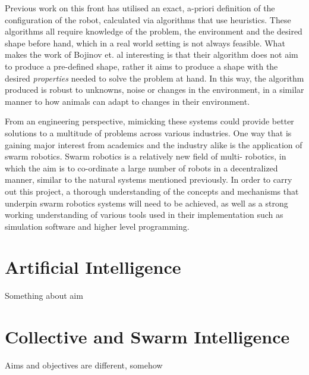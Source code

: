 Previous work on this front has utilised an exact, a-priori definition of the configuration of the robot, calculated via algorithms that use heuristics. \cite{metricsrob} These algorithms all require knowledge of the problem, the environment and the desired shape before hand, which in a real world setting is not always feasible.  What makes the work of Bojinov et. al interesting is that their algorithm does not aim to produce a pre-defined shape, rather it aims to produce a shape with the desired \textsl{properties} needed to solve the problem at hand. In this way, the algorithm produced is robust to unknowns, noise or changes in the environment, in a similar manner to how animals can adapt to changes in their environment.

From an engineering perspective, mimicking these systems could provide better solutions to a multitude
of problems across various industries. One way that is gaining major interest from academics and the
industry alike is the application of swarm robotics. Swarm robotics is a relatively new field of multi-
robotics, in which the aim is to co-ordinate a large number of robots in a decentralized manner, similar to
the natural systems mentioned previously. In order to carry out this project, a thorough understanding of
the concepts and mechanisms that underpin swarm robotics systems will need to be achieved, as well as
a strong working understanding of various tools used in their implementation such as simulation software
and higher level programming.

\section{Artificial Intelligence}
Something about aim

\section{Collective and Swarm Intelligence}
Aims and objectives are different, somehow
